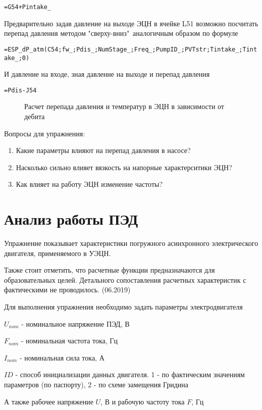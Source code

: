 { \small  \texttt{=G54+Pintake\_}}

Предварительно задав давление на выходе ЭЦН в ячейке L51 возможно посчитать перепад давления методом "сверху-вниз"\ аналогичным образом по формуле

{ \small  \texttt{=ESP\_dP\_atm(C54;fw\_;Pdis\_;NumStage\_;Freq\_;PumpID\_;PVTstr;Tintake\_;Tintake\_;0)}}

И давление на входе, зная давление на выходе и перепад давления

{ \small  \texttt{=Pdis-J54}}

\begin{figure}[h!]
	\center{\texttt{[image: Ex70\_4]}}
	\caption{Расчет перепада давления и температур в ЭЦН в зависимости от дебита}
	\label{ris:Ex70_4}
\end{figure}

Вопросы для упражнения:

\begin{enumerate}
	\item Какие параметры влияют на перепад давления в насосе?
	\item Насколько сильно влияет вязкость на напорные характерситики ЭЦН?
	\item Как влияет на работу ЭЦН изменение частоты?
\end{enumerate}


\section{Анализ работы ПЭД}

Упражнение показывает характеристики погружного асинхронного электрического двигателя, применяемого в УЭЦН.

Также стоит отметить, что расчетные функции предназначаются для образовательных целей. Детального сопоставления расчетных характеристик с фактическими не проводилось. (06.2019)

Для выполнения упражнения необходимо задать параметры электродвигателя

$U_{nom}$ - номинальное напряжение ПЭД, В

$F_{nom}$ - номинальная частота тока, Гц

$I_{nom}$ - номинальная сила тока, А

$ID$ - способ инициализации данных двигателя. 1 - по фактическим значениям параметров (по паспорту), 2 - по схеме замещения Гридина

А также рабочее напряжение $U$, В и рабочую частоту тока $F$, Гц


